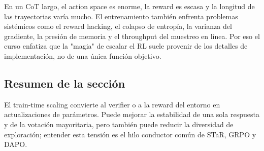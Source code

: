 En un CoT largo, el action space es enorme, la reward es escasa y la longitud de las trayectorias varía mucho. El entrenamiento también enfrenta problemas sistémicos como el reward hacking, el colapso de entropía, la varianza del gradiente, la presión de memoria y el throughput del muestreo en línea. Por eso el curso enfatiza que la "magia" de escalar el RL suele provenir de los detalles de implementación, no de una única función objetivo.

\subsection{Resumen de la sección}

El train-time scaling convierte al verifier o a la reward del entorno en actualizaciones de parámetros. Puede mejorar la estabilidad de una sola respuesta y de la votación mayoritaria, pero también puede reducir la diversidad de exploración; entender esta tensión es el hilo conductor común de STaR, GRPO y DAPO.
